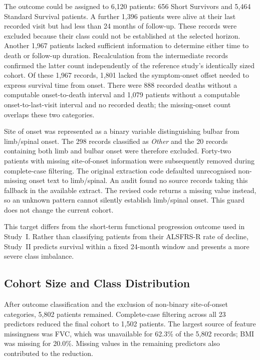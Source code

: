 The outcome could be assigned to 6,120 patients: 656 Short Survivors and 5,464 Standard Survival patients. A further 1,396 patients were alive at their last recorded visit but had less than 24 months of follow-up. These records were excluded because their class could not be established at the selected horizon. Another 1,967 patients lacked sufficient information to determine either time to death or follow-up duration.
Recalculation from the intermediate records confirmed the latter count independently of the reference study's identically sized cohort. Of these 1,967 records, 1,801 lacked the symptom-onset offset needed to express survival time from onset. There were 888 recorded deaths without a computable onset-to-death interval and 1,079 patients without a computable onset-to-last-visit interval and no recorded death; the missing-onset count overlaps these two categories.

Site of onset was represented as a binary variable distinguishing bulbar from limb/spinal onset. The 298 records classified as \textit{Other} and the 20 records containing both limb and bulbar onset were therefore excluded. Forty-two patients with missing site-of-onset information were subsequently removed during complete-case filtering.
The original extraction code defaulted unrecognised non-missing onset text to limb/spinal. An audit found no source records taking this fallback in the available extract. The revised code returns a missing value instead, so an unknown pattern cannot silently establish limb/spinal onset. This guard does not change the current cohort.

This target differs from the short-term functional progression outcome used in Study~I. Rather than classifying patients from their ALSFRS-R rate of decline, Study~II predicts survival within a fixed 24-month window and presents a more severe class imbalance.

\subsection{Cohort Size and Class Distribution}
\label{subsec:s2_cohort}

After outcome classification and the exclusion of non-binary site-of-onset categories, 5,802 patients remained. Complete-case filtering across all 23 predictors reduced the final cohort to 1,502 patients. The largest source of feature missingness was FVC, which was unavailable for 62.3\% of the 5,802 records; BMI was missing for 20.0\%. Missing values in the remaining predictors also contributed to the reduction.

